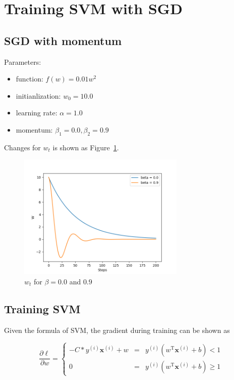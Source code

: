 \documentclass[a4paper]{article}
\begin{document}
\section{Training SVM with SGD}

\subsection{SGD with momentum}

Parameters:
\begin{itemize}
    \item function: $f(w)=0.01w^2$
    \item initianlization: $w_0=10.0$
    \item learning rate: $\alpha=1.0$
    \item momentum: $\beta_1=0.0, \beta_2=0.9$
\end{itemize}

Changes for $w_t$ is shown as Figure~\ref{fig: SGD}.

\begin{figure}[htbp]
\centering
\includegraphics[width = 8cm]{SGD}
\caption{$w_t$ for $\beta=0.0$ and $0.9$}
\label{fig: SGD}
\end{figure}

\subsection{Training SVM}

Given the formula of SVM, the gradient during training can be shown as

\begin{equation}
\frac{\partial \ell}{\partial w}=\left\{
\begin{aligned}
-C*y^{(i)}\mathbf{x}^{(i)}+w & = & y^{(i)}(w^{\mathrm{T}}\mathbf{x}^{(i)}+b)<1 \\
0 & = & y^{(i)}(w^{\mathrm{T}}\mathbf{x}^{(i)}+b)\ge1
\end{aligned}
\right.
\end{equation}
\end{document}
